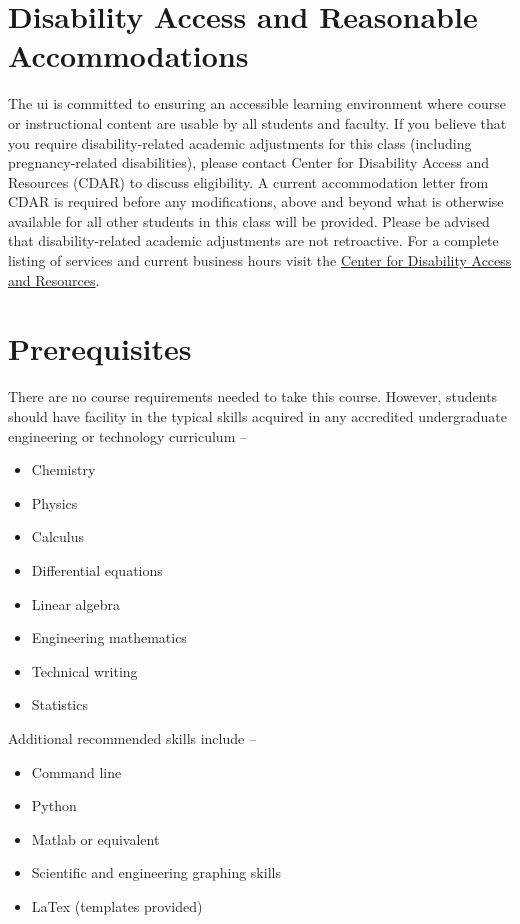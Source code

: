 \documentclass[11pt,letterpaper]{article}
\newcommand{\acl}{\acrlong} %
\begin{document}
\section{Disability Access and Reasonable Accommodations}
The \acl{ui} is committed to ensuring an accessible learning environment where course or instructional content are usable by all students and faculty. If you believe that you require disability-related academic adjustments for this class (including pregnancy-related disabilities), please contact Center for Disability Access and Resources (CDAR) to discuss eligibility. A current accommodation letter from CDAR is required before any modifications, above and beyond what is otherwise available for all other students in this class will be provided. Please be advised that disability-related academic adjustments are not retroactive. For a complete listing of services and current business hours visit the \href{https://www.uidaho.edu/current-students/cdar}{Center for Disability Access and Resources}.


\section{Prerequisites}
There are no course requirements needed to take this course. However, students should have facility in the typical skills acquired in any accredited undergraduate engineering or technology curriculum --
\begin{itemize}[begin-vspace=0ex,item-vspace=-0.5ex,begin-extra-vspace=1ex,para-vspace=1ex,left-margin=2.25ex,item-indent=0ex]
    \item Chemistry
    \item Physics
    \item Calculus
    \item Differential equations
    \item Linear algebra
    \item Engineering mathematics
    \item Technical writing
    \item Statistics
\end{itemize}

Additional recommended skills include -- 
\begin{itemize}[begin-vspace=0ex,item-vspace=-0.5ex,begin-extra-vspace=1ex,para-vspace=1ex,left-margin=2.25ex,item-indent=0ex]
    \item Command line
    \item Python
    \item Matlab or equivalent
    \item Scientific and engineering graphing skills
    \item LaTex (templates provided)
\end{itemize}
\end{document}
